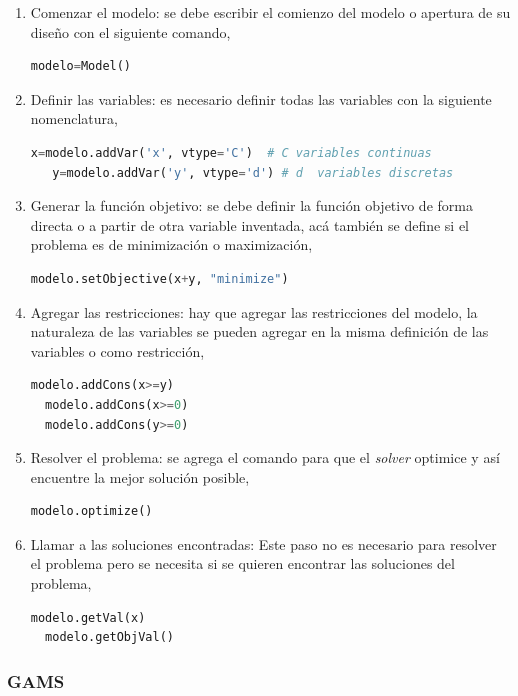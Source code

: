 \begin{enumerate}
    \item Comenzar el modelo: se debe escribir el comienzo del modelo o apertura de su diseño con el siguiente comando,
   \begin{lstlisting}[language=Python]
   modelo=Model()
   \end{lstlisting}
   \item Definir las variables: es necesario definir todas las variables con la siguiente nomenclatura,
   \begin{lstlisting}[language=Python]
   x=modelo.addVar('x', vtype='C')  # C variables continuas 
   y=modelo.addVar('y', vtype='d') # d  variables discretas 
   \end{lstlisting}
   \item Generar la función objetivo: se debe definir la función objetivo de forma directa o a partir de otra variable inventada, acá también se define si el problema es de minimización o maximización,
   \begin{lstlisting}[language=Python]
  modelo.setObjective(x+y, "minimize")
  \end{lstlisting}
  \item Agregar las restricciones: hay que agregar las restricciones del modelo, la naturaleza de las variables se pueden agregar en la misma definición de las variables o como restricción,
  \begin{lstlisting}[language=Python]
  modelo.addCons(x>=y)
  modelo.addCons(x>=0)
  modelo.addCons(y>=0)
  \end{lstlisting}
  
  \item  Resolver el problema: se agrega el comando para que el \textit{solver} optimice y así encuentre la mejor solución posible,
  \begin{lstlisting}[language=Python]
  modelo.optimize()
  \end{lstlisting}
  \item  Llamar a las soluciones encontradas: Este paso no es necesario para resolver el problema pero se necesita si se quieren encontrar las soluciones del problema,
  \begin{lstlisting}[language=Python]
  modelo.getVal(x)
  modelo.getObjVal()
  \end{lstlisting}
\end{enumerate}

\subsubsection{GAMS}

